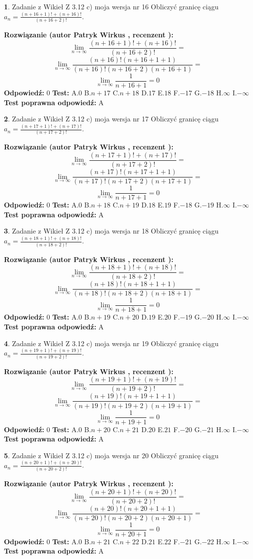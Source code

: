 \documentclass[12pt, a4paper]{article}
\theoremstyle{definition} %
\newtheorem{zad}{}
\newcommand{\zadStart}[1]{\begin{zad}#1\newline}
\newcommand{\zadStop}{\end{zad}}
\newcommand{\rozwStart}[2]{\noindent \textbf{Rozwiązanie (autor #1 , recenzent #2): }\newline}
\newcommand{\rozwStop}{\newline}
\newcommand{\odpStart}{\noindent \textbf{Odpowiedź:}\newline}
\newcommand{\odpStop}{\newline}
\newcommand{\testStart}{\noindent \textbf{Test:}\newline}
\newcommand{\testStop}{\newline}
\newcommand{\kluczStart}{\noindent \textbf{Test poprawna odpowiedź:}\newline}
\newcommand{\kluczStop}{\newline}
\begin{document}
\zadStart{Zadanie z Wikieł Z 3.12 c) moja wersja nr 16}
Obliczyć granicę ciągu $a_{n}=\frac{(n+16+1)!+(n+16)!}{(n+16+2)!}$.
\zadStop
\rozwStart{Patryk Wirkus}{}
$$\lim\limits_{n\to\infty}\frac{(n+16+1)!+(n+16)!}{(n+16+2)!}=$$
$$\lim\limits_{n\to\infty}\frac{(n+16)!(n+16+1+1)}{(n+16)!(n+16+2)(n+16+1)}=$$
$$\lim\limits_{n\to\infty}\frac{1}{n+16+1}= 0$$
\rozwStop
\odpStart
$0$
\odpStop
\testStart
A.$0$
B.$n+17$
C.$n+18$
D.$17$
E.$18$
F.$-17$
G.$-18$
H.$\infty$
I.$-\infty$
\testStop
\kluczStart
A
\kluczStop



\zadStart{Zadanie z Wikieł Z 3.12 c) moja wersja nr 17}
Obliczyć granicę ciągu $a_{n}=\frac{(n+17+1)!+(n+17)!}{(n+17+2)!}$.
\zadStop
\rozwStart{Patryk Wirkus}{}
$$\lim\limits_{n\to\infty}\frac{(n+17+1)!+(n+17)!}{(n+17+2)!}=$$
$$\lim\limits_{n\to\infty}\frac{(n+17)!(n+17+1+1)}{(n+17)!(n+17+2)(n+17+1)}=$$
$$\lim\limits_{n\to\infty}\frac{1}{n+17+1}= 0$$
\rozwStop
\odpStart
$0$
\odpStop
\testStart
A.$0$
B.$n+18$
C.$n+19$
D.$18$
E.$19$
F.$-18$
G.$-19$
H.$\infty$
I.$-\infty$
\testStop
\kluczStart
A
\kluczStop



\zadStart{Zadanie z Wikieł Z 3.12 c) moja wersja nr 18}
Obliczyć granicę ciągu $a_{n}=\frac{(n+18+1)!+(n+18)!}{(n+18+2)!}$.
\zadStop
\rozwStart{Patryk Wirkus}{}
$$\lim\limits_{n\to\infty}\frac{(n+18+1)!+(n+18)!}{(n+18+2)!}=$$
$$\lim\limits_{n\to\infty}\frac{(n+18)!(n+18+1+1)}{(n+18)!(n+18+2)(n+18+1)}=$$
$$\lim\limits_{n\to\infty}\frac{1}{n+18+1}= 0$$
\rozwStop
\odpStart
$0$
\odpStop
\testStart
A.$0$
B.$n+19$
C.$n+20$
D.$19$
E.$20$
F.$-19$
G.$-20$
H.$\infty$
I.$-\infty$
\testStop
\kluczStart
A
\kluczStop



\zadStart{Zadanie z Wikieł Z 3.12 c) moja wersja nr 19}
Obliczyć granicę ciągu $a_{n}=\frac{(n+19+1)!+(n+19)!}{(n+19+2)!}$.
\zadStop
\rozwStart{Patryk Wirkus}{}
$$\lim\limits_{n\to\infty}\frac{(n+19+1)!+(n+19)!}{(n+19+2)!}=$$
$$\lim\limits_{n\to\infty}\frac{(n+19)!(n+19+1+1)}{(n+19)!(n+19+2)(n+19+1)}=$$
$$\lim\limits_{n\to\infty}\frac{1}{n+19+1}= 0$$
\rozwStop
\odpStart
$0$
\odpStop
\testStart
A.$0$
B.$n+20$
C.$n+21$
D.$20$
E.$21$
F.$-20$
G.$-21$
H.$\infty$
I.$-\infty$
\testStop
\kluczStart
A
\kluczStop



\zadStart{Zadanie z Wikieł Z 3.12 c) moja wersja nr 20}
Obliczyć granicę ciągu $a_{n}=\frac{(n+20+1)!+(n+20)!}{(n+20+2)!}$.
\zadStop
\rozwStart{Patryk Wirkus}{}
$$\lim\limits_{n\to\infty}\frac{(n+20+1)!+(n+20)!}{(n+20+2)!}=$$
$$\lim\limits_{n\to\infty}\frac{(n+20)!(n+20+1+1)}{(n+20)!(n+20+2)(n+20+1)}=$$
$$\lim\limits_{n\to\infty}\frac{1}{n+20+1}= 0$$
\rozwStop
\odpStart
$0$
\odpStop
\testStart
A.$0$
B.$n+21$
C.$n+22$
D.$21$
E.$22$
F.$-21$
G.$-22$
H.$\infty$
I.$-\infty$
\testStop
\kluczStart
A
\kluczStop
\end{document}
